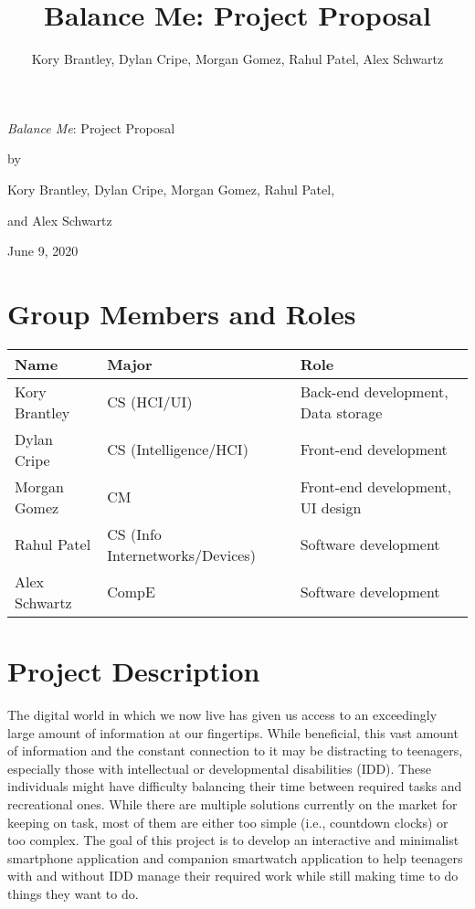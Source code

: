 \documentclass[12pt,letterpaper]{article}
\title{Balance Me: Project Proposal}
\author{Kory Brantley, Dylan Cripe, Morgan Gomez, Rahul Patel, Alex Schwartz}
\begin{document}

\begin{center}
{\huge \textit{Balance Me}: Project Proposal}

\bigskip

\bigskip

by

{\large Kory Brantley, Dylan Cripe, Morgan Gomez, Rahul Patel, 

and Alex Schwartz}
\end{center}
\begin{center}
June 9, 2020
\end{center}

\newpage
{}

\section*{Group Members and Roles}

\begin{table}[h]
\begin{tabular}{|l|l|l|}
\hline
\textbf{Name}  & \textbf{Major}                   & \textbf{Role}                        \\ \hline
Kory Brantley  & CS (HCI/UI)                      & Back-end development, Data storage   \\ \hline
Dylan Cripe    & CS (Intelligence/HCI)            & Front-end development                \\ \hline
Morgan Gomez   & CM                               & Front-end development, UI design     \\ \hline
Rahul Patel    & CS (Info Internetworks/Devices)  & Software development                 \\ \hline
Alex Schwartz  & CompE                            & Software development                 \\ \hline
\end{tabular}
\end{table}


\newpage
\section{Project Description}

The digital world in which we now live has given us access to an exceedingly large amount of information at our fingertips. While beneficial, this vast amount of information and the constant connection to it may be distracting to teenagers, especially those with intellectual or developmental disabilities (IDD). These individuals might have difficulty balancing their time between required tasks and recreational ones. While there are multiple solutions currently on the market for keeping on task, most of them are either too simple (i.e., countdown clocks) or too complex. The goal of this project is to develop an interactive and minimalist smartphone application and companion smartwatch application to help teenagers with and without IDD manage their required work while still making time to do things they want to do.
\end{document}
